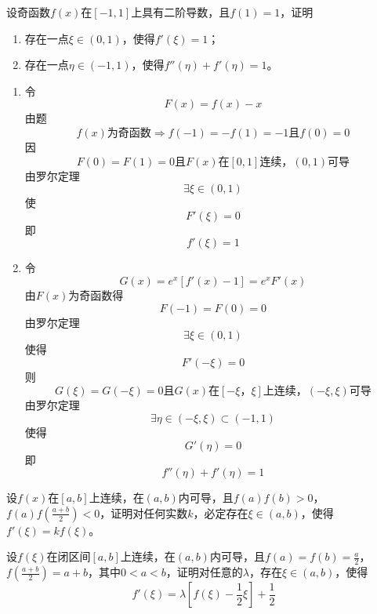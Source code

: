 \begin{example}
	设奇函数$f(x)$在$[-1,1]$上具有二阶导数，且$f(1)=1$，证明
	\begin{enumerate}
		\item 存在一点$\xi\in(0,1)$，使得$f'(\xi)=1$；
		\item 存在一点$\eta\in(-1,1)$，使得$f''(\eta)+f'(\eta)=1$。
	\end{enumerate}
\end{example}
	\begin{newproof}
		\begin{enumerate}
			\item 
			令\[F\left( x \right) =f\left( x \right) -x\]
		由题\[f\left( x \right) 为\text{奇函数}\Longrightarrow f\left( -1 \right) =-f\left( 1 \right) =-1\text{且}f\left( 0 \right) =0\]
		因\[F\left( 0 \right) =F\left( 1 \right) =0\text{且}F\left( x \right) \text{在}\left[ 0,1 \right] \text{连续，}\left( 0,1 \right) \text{可导}\]
		由罗尔定理\[\exists \xi \in \left( 0,1 \right) \]
		使\[F'\left( \xi \right) =0\]
		即\[f'\left( \xi \right) =1\]
			\item
			令\[G\left( x \right) =e^x\left[ f'\left( x \right) -1 \right] =e^xF'\left( x \right) \]
			由$F(x)$为奇函数得\[F\left( -1 \right) =F\left( 0 \right) =0\]
			由罗尔定理\[\exists \xi \in \left( 0,1 \right) \]
			使得\[F'\left( -\xi \right) =0\]
			则\[G\left( \xi \right) =G\left( -\xi \right) =0\text{且}G\left( x \right) \text{在}\left[ -\xi \text{，}\xi \right] \text{上连续，}\left( -\xi ,\xi \right) \text{可导}\]
			由罗尔定理\[\exists \eta \in \left( -\xi ,\xi \right) \subset \left( -1,1 \right) \]
			使得\[G'\left( \eta \right) =0\]
			即\[f''\left( \eta \right) +f'\left( \eta \right) =1\]

		\end{enumerate}
		
	\end{newproof}

\begin{example}
	设$f(x)$在$[a,b]$上连续，在$(a,b)$内可导，且$f(a)f(b)>0$，$f(a)f(\frac{a+b}{2})<0$，证明对任何实数$k$，必定存在$\xi\in(a,b)$，使得$f'(\xi)=kf(\xi)$。
\end{example}

\begin{example}
	设$f(\xi)$在闭区间$[a,b]$上连续，在$(a,b)$内可导，且$f(a)=f(b)=\frac{a}{2}$，$f(\frac{a+b}{2})=a+b$，其中$0<a<b$，证明对任意的$\lambda$，存在$\xi\in(a,b)$，使得\[f'(\xi)=\lambda\left[f(\xi)-\frac{1}{2}\xi\right]+\frac{1}{2}\]
\end{example}

